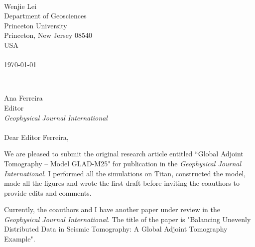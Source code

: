 \documentclass[11pt]{article}
\begin{document}

\begin{minipage}[t]{0.55\textwidth}
~ \vspace{0pt}
\end{minipage}
\begin{minipage}[t]{0.45\textwidth}
Wenjie Lei \\
Department of Geosciences \\
Princeton University \\
Princeton, New Jersey 08540\\
USA \\
~ \\
\today \\ 
\end{minipage} \hspace{0cm}\\

\par
\noindent
Ana Ferreira\\
Editor \\
\textit{Geophysical Journal International}\\
~ \\
Dear Editor Ferreira,\\
\par \noindent
We are pleased to submit the original research article entitled ``Global Adjoint Tomography -- Model GLAD-M25" for publication in the \textit{Geophysical Journal International}. 
I performed all the simulations on Titan, constructed the model, made all the figures and wrote the first draft before inviting the coauthors to provide edits and comments.

\par \noindent
Currently, the coauthors and I have another paper under review in the \textit{Geophysical Journal International}. The title of the paper is "Balancing Unevenly Distributed Data in Seismic Tomography: A Global Adjoint Tomography Example".
\end{document}
